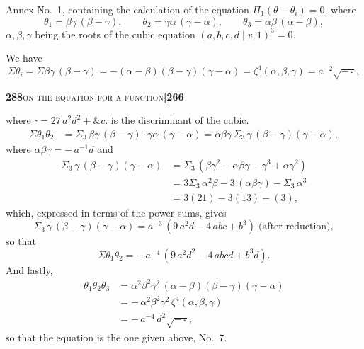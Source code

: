 \documentclass[11pt]{article}
\newcommand{\Cdel}{\mid}
\begin{document}
\medskip

\noindent Annex No.~1, containing the calculation of the equation $\Pi_1(\theta - \theta_i) = 0$, where
\[
   \theta_1 = \beta\gamma\,(\beta - \gamma),\qquad \theta_2 = \gamma\alpha\,(\gamma - \alpha),\qquad \theta_3 = \alpha\beta\,(\alpha - \beta),
\]
$\alpha, \beta, \gamma$ being the roots of the cubic equation $(a, b, c, d \Cdel v, 1)^3 = 0$.

\medskip

\noindent We have
\[
   \Sigma\theta_i = \Sigma\beta\gamma\,(\beta - \gamma) = -(\alpha - \beta)(\beta - \gamma)(\gamma - \alpha) = \zeta^4(\alpha, \beta, \gamma) = a^{-2}\sqrt{-\,\square},
\]

\newpage
\setcounter{page}{288}

\noindent\textbf{288}\hfill\textsc{on the equation for a function}\hfill\textbf{[266}

\medskip

\noindent where $\square = 27\,a^2 d^2 + \&c.$ is the discriminant of the cubic.
\[
\begin{aligned}
   \Sigma\theta_1\theta_2 &= \Sigma_3\,\beta\gamma\,(\beta - \gamma)\cdot\gamma\alpha\,(\gamma - \alpha) = \alpha\beta\gamma\,\Sigma_3\,\gamma\,(\beta - \gamma)(\gamma - \alpha),
\end{aligned}
\]
where $\alpha\beta\gamma = -\,a^{-1}d$ and
\[
\begin{aligned}
   \Sigma_3\,\gamma\,(\beta - \gamma)(\gamma - \alpha) &= \Sigma_3\,(\beta\gamma^2 - \alpha\beta\gamma - \gamma^3 + \alpha\gamma^2)\\
   &= 3\Sigma_3\,\alpha^2\beta - 3\,(\alpha\beta\gamma) - \Sigma_3\,\alpha^3\\
   &= 3 (21) - 3 (13) - (3),
\end{aligned}
\]
which, expressed in terms of the power-sums, gives
\[
   \Sigma_3\,\gamma\,(\beta - \gamma)(\gamma - \alpha) = a^{-3}\,(9\,a^2 d - 4\,a b c + b^3) \;\text{(after reduction)},
\]
so that
\[
   \Sigma\theta_1\theta_2 = -\,a^{-4}\,(9\,a^2 d^2 - 4\,a b c d + b^3 d).
\]
And lastly,
\[
\begin{aligned}
   \theta_1\theta_2\theta_3 &= \alpha^2\beta^2\gamma^2\,(\alpha - \beta)(\beta - \gamma)(\gamma - \alpha)\\
   &= -\,\alpha^2\beta^2\gamma^2\,\zeta^4(\alpha, \beta, \gamma)\\
   &= -\,a^{-4}\,d^2\sqrt{-\,\square},
\end{aligned}
\]
so that the equation is the one given above, No.~7.
\end{document}
